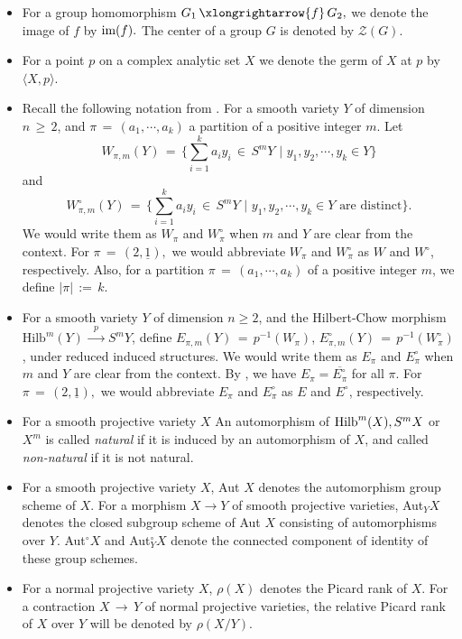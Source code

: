 \documentclass[12pt,reqno]{amsart}
\theoremstyle{definition}
\numberwithin{equation}{section}
\begin{document}
\begin{itemize}
  \item For a group homomorphism $ G_{1}\, \xlongrightarrow{f} \,G_{2},$ we denote the image of $f$ by $ \textnormal{im}(f).$ The center of a group $G$ is denoted by $ \mathcal{Z}(G).$ 
  \item For a point $p$ on a complex analytic set $X$ we denote the germ of $X$ at $p$ by $\langle X, p\rangle$.
  \item Recall the following notation from \cite{BSV3}. For a smooth variety $Y$ of dimension $n\,\geq\, 2$, and $ \pi\,=\, (a_{1},\cdots,a_{k})$ a partition of a positive integer $m$. Let 
  $$ W_{\pi,m}(Y)\,=\, \{ \sum_{i=1}^{k}a_{i}y_{i}\, \in\, S^{m}Y \, \, | \, \, y_{1},y_{2},\cdots,y_{k} \in Y\}$$ and
  $$ W_{\pi,m}^{\circ}(Y)\,=\, \{ \sum_{i=1}^{k}a_{i}y_{i}\, \in\, S^{m}Y \, \, | \, \, y_{1},y_{2},\cdots,y_{k} \in Y \text{ are distinct}\}.$$
We would write them as $W_{\pi}$ and $W_{\pi}^{\circ}$ when $m$ and $Y$ are clear from the context.  For $ \pi\,=\, (2, \underline{1}),$ we would abbreviate $W_{\pi}$ and $W_{\pi}^{\circ}$ as $W$ and $W^{\circ}$, respectively. Also, for a partition $ \pi\,=\, (a_{1},\cdots,a_{k})$ of a positive integer $m$, we define $|\pi|\,:=\,k.$
  \item \label{notation} For a smooth variety $Y$ of dimension $n\geq 2$, and the Hilbert-Chow morphism $\textrm{Hilb}^{m}(Y)\,\xrightarrow{\,\,\,p\,\,\,}\, S^{m} Y$, define $E_{{\pi},m}(Y)\,=\, p^{-1}(W_{\pi})$, $E^{\circ}_{{\pi},m}(Y)\,=\, p^{-1}(W^{\circ}_{\pi})$, under reduced induced structures. We would write them as $E_{\pi}$ and $E_{\pi}^{\circ}$ when $m$ and $Y$ are clear from the context. By {\cite[Lemma 3.6.1]{DMM}}, we have $E_{\pi}=\overline{E_{\pi}^{\circ}}$ for all $\pi$. For $ \pi\,=\, (2, \underline{1}),$ we would abbreviate $E_{\pi}$ and $E_{\pi}^{\circ}$ as $E$ and $E^{\circ}$, respectively. 
   \item For a smooth projective variety $X$ An automorphism of $\textnormal{Hilb}^{m}(X), S^mX$ or $X^m$ is called \textit{natural} if it is induced by an automorphism of $X$, and called \textit{non-natural} if it is not natural.
  \item For a smooth projective variety $X$, Aut $X$ denotes the automorphism group scheme of $X$. For a morphism $X\to Y$ of smooth projective varieties, Aut$_Y X$ denotes the closed subgroup scheme of Aut $X$ consisting of automorphisms over $Y$. Aut$^{\circ} X$ and Aut$^{\circ}_Y X$ denote the connected component of identity of these group schemes.
  \item For a normal projective variety $X$, $\rho(X)$ denotes the Picard rank of $X$. For a contraction $X\,\to\, Y$ of normal projective varieties, the relative Picard rank of $X$ over $Y$ will be denoted by $\rho(X/Y).$

\end{itemize}
\end{document}
